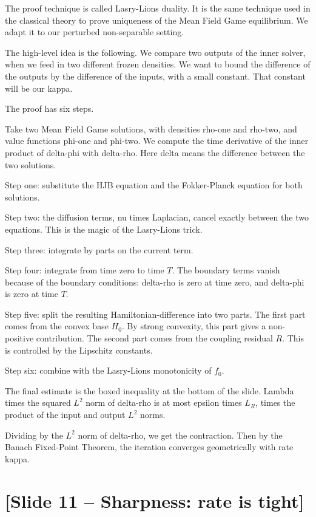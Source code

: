 \documentclass[11pt]{article}
\begin{document}
The proof technique is called Lasry-Lions duality. It is the same technique
used in the classical theory to prove uniqueness of the Mean Field Game
equilibrium. We adapt it to our perturbed non-separable setting.

The high-level idea is the following. We compare two outputs of the inner
solver, when we feed in two different frozen densities. We want to bound
the difference of the outputs by the difference of the inputs, with a small
constant. That constant will be our kappa.

The proof has six steps.

Take two Mean Field Game solutions, with densities rho-one and rho-two,
and value functions phi-one and phi-two. We compute the time derivative
of the inner product of delta-phi with delta-rho. Here delta means the
difference between the two solutions.

Step one: substitute the HJB equation and the Fokker-Planck equation for
both solutions.

Step two: the diffusion terms, nu times Laplacian, cancel exactly between
the two equations. This is the magic of the Lasry-Lions trick.

Step three: integrate by parts on the current term.

Step four: integrate from time zero to time $T$. The boundary terms vanish
because of the boundary conditions: delta-rho is zero at time zero, and
delta-phi is zero at time $T$.

Step five: split the resulting Hamiltonian-difference into two parts.
The first part comes from the convex base $H_0$. By strong convexity,
this part gives a non-positive contribution. The second part comes from
the coupling residual $R$. This is controlled by the Lipschitz constants.

Step six: combine with the Lasry-Lions monotonicity of $f_0$.

The final estimate is the boxed inequality at the bottom of the slide.
Lambda times the squared $L^2$ norm of delta-rho is at most epsilon times
$L_R$, times the product of the input and output $L^2$ norms.

Dividing by the $L^2$ norm of delta-rho, we get the contraction. Then by
the Banach Fixed-Point Theorem, the iteration converges geometrically with
rate kappa.

\section*{[Slide 11 -- Sharpness: rate is tight]}
\end{document}
